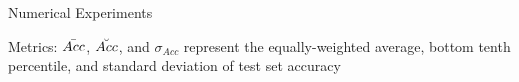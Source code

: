 \documentclass{beamer}
\begin{document}
\begin{frame}[allowframebreaks]{Numerical Experiments}




    Metrics: $\Bar{Acc}$, $\Breve{Acc}$, and $\sigma_{Acc}$ represent the equally-weighted average, bottom tenth percentile, and standard deviation of test set accuracy
    

\end{frame}
\end{document}

